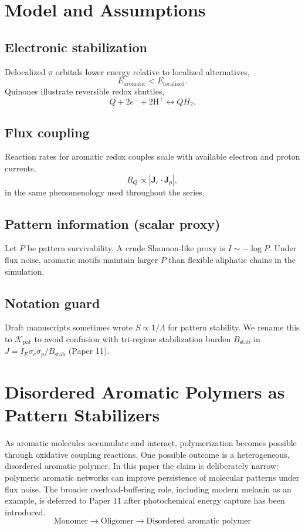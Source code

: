 \documentclass[11pt,a4paper]{article}
\begin{document}
\section{Model and Assumptions}

\subsection{Electronic stabilization}
Delocalized $\pi$ orbitals lower energy relative to localized alternatives,
\begin{equation}
E_{\mathrm{aromatic}} < E_{\mathrm{localized}}.
\end{equation}
Quinones illustrate reversible redox shuttles,
\begin{equation}
Q + 2e^- + 2\mathrm{H}^+ \leftrightarrow QH_2.
\end{equation}

\subsection{Flux coupling}
Reaction rates for aromatic redox couples scale with available electron and proton currents,
\begin{equation}
R_Q \propto |\bm{J}_e\cdot\bm{J}_p|,
\end{equation}
in the same phenomenology used throughout the series.

\subsection{Pattern information (scalar proxy)}
Let $P$ be pattern survivability. A crude Shannon-like proxy is $I\sim -\log P$. Under flux noise, aromatic motifs maintain larger $P$ than flexible aliphatic chains in the simulation.

\subsection{Notation guard}
Draft manuscripts sometimes wrote $S\propto 1/\Lambda$ for pattern stability. We rename this to $\mathcal{K}_{\mathrm{pat}}$ to avoid confusion with tri-regime stabilization burden $B_{\mathrm{stab}}$ in $J=I_E\sigma_e\sigma_p/B_{\mathrm{stab}}$ (Paper 11).

\section{Disordered Aromatic Polymers as Pattern Stabilizers}
As aromatic molecules accumulate and interact, polymerization becomes possible through oxidative coupling reactions. One possible outcome is a heterogeneous, disordered aromatic polymer. In this paper the claim is deliberately narrow: polymeric aromatic networks can improve persistence of molecular patterns under flux noise. The broader overload-buffering role, including modern melanin as an example, is deferred to Paper 11 after photochemical energy capture has been introduced.
\begin{equation}
\text{Monomer} \rightarrow \text{Oligomer} \rightarrow \text{Disordered aromatic polymer}
\end{equation}
\end{document}
